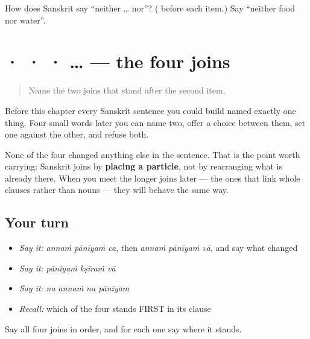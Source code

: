\begin{tcolorbox}[breakable,colback=teal!4,colframe=teal!35!black,title={Before you move on}]
How does Sanskrit say \textquotedblleft{}neither … nor\textquotedblright{}? (\textbf{} before each item.) Say \textquotedblleft{}neither food nor water\textquotedblright{}.
\end{tcolorbox}
\section[\texorpdfstring{\sk{च} · \sk{वा} · \sk{किन्तु} … (ca · vā · kintu …)}{च · वा · किन्तु … (ca · vā · kintu …)}]{ ·  ·  ·  …  — the four joins}

\label{lesson:SA-R52-joins}



\begin{quote}
Name the two joins that stand after the second item.
\end{quote}

\begin{grammarlens}[title={What you've built}]
Before this chapter every Sanskrit sentence you could build named exactly one thing. Four small words later you can name two, offer a choice between them, set one against the other, and refuse both.

None of the four changed anything else in the sentence. That is the point worth carrying: Sanskrit joins by \textbf{placing a particle}, not by rearranging what is already there. When you meet the longer joins later — the ones that link whole clauses rather than nouns — they will behave the same way.
\end{grammarlens}

\subsection*{Your turn}
\begin{itemize}
\raggedright
  \item \emph{Say it:} \emph{annaṁ pānīyaṁ ca}, then \emph{annaṁ pānīyaṁ vā}, and say what changed
  \item \emph{Say it:} \emph{pānīyaṁ kṣīraṁ vā}
  \item \emph{Say it:} \emph{na annaṁ na pānīyam}
  \item \emph{Recall:} which of the four stands FIRST in its clause
\end{itemize}

\begin{tcolorbox}[breakable,colback=teal!4,colframe=teal!35!black,title={Before you move on}]
Say all four joins in order, and for each one say where it stands.
\end{tcolorbox}
